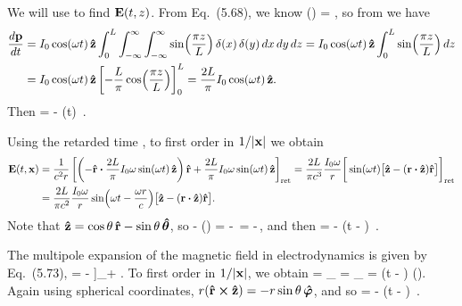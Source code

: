 \begin{solution}
	We will use  to find $\vb{E}(t, z)$.  From Eq.~(5.68), we know
	\beq
		\int \vJ(\vx) \dcx = ,
	\eeq
	so from  we have
	\begin{align*}
		\dv{\vb{p}}{t} &= I_0 \cos(\omega t) \,\vb{\hat{z}} \int_0^L \int_{-\infty}^\infty \int_{-\infty}^\infty \sin(\frac{\pi z}{L}) \,\delta(x) \,\delta(y) \dd{x} \dd{y} \dd{z}
		= I_0 \cos(\omega t) \,\vb{\hat{z}} \int_0^L \sin(\frac{\pi z}{L}) \dd{z} \\
		&= I_0 \cos(\omega t) \,\vb{\hat{z}} \left[ -\frac{L}{\pi} \cos(\frac{\pi z}{L}) \right]_0^L
		= \frac{2 L}{\pi} I_0 \cos(\omega t) \,\vb{\hat{z}}.
	\end{align*}
	Then
	\beq
		 = - \Io \omg \sin(\omg t) \,\zh.
	\eeq
	
	Using the retarded time , to first order in $1/\abs{\vb{x}}$ we obtain
	\begin{align*}
		\vE\tx &= \frac{1}{c^2 r} \left[ \left( -\rh \vdot \frac{2 L}{\pi} \Io \omg \sin(\omg t) \,\zh \right) \rh + \frac{2 L}{\pi} \Io \omg \sin(\omg t) \,\zh \right]_\ret
		= \frac{2 L}{\pi c^3} \frac{\Io \omg}{r} \bigg[ \sin(\omg t) \big[ \zh - (\vr \vdot \zh) \rh \big] \bigg]_\ret \\
		&= \frac{2 L}{\pi c^2} \frac{\Io \omg}{r} \sin(\omg t - \frac{\omg r}{c}) \big[ \zh - (\vr \vdot \zh) \rh \big].
	\end{align*}
	Note that $\vb{\hat{z}} = \cos\theta \,\vb{\hat{r}} - \sin\theta \,\boldsymbol{\hat{\theta}}$, so
	\beq
		\zh - (\rh \vdot \zh) \rh = \zh - \cos\tht \,\rh = -\sin\tht \,\thh,
	\eeq
	and then
	\beq
		\vE\tx = -  \sin(\omg t - ) \sin\tht \,\thh.
	\eeq

	The multipole expansion of the magnetic field in electrodynamics is given by Eq.~(5.73),
	\beqn \label{Bfield}
		\vB\tx = - \xh \cross \left[ \dv[2]{\vp}{t} \right]_\ret + .
	\eeqn
	To first order in $1/\abs{\vb{x}}$, we obtain
	\beq
		\vB\tx =  \rh \cross {}_\ret
		=   \rh \cross {}_\ret
		=   \sin(\omg t - ) (\rh \cross \zh).
	\eeq
	Again using spherical coordinates, $r (\vb{\hat{r}} \cross \vb{\hat{z}}) = -r \sin\theta \,\boldsymbol{\hat{\varphi}}$, and so
	\beq
		\vB\tx = -  \sin(\omg t - ) \sin\tht \,\phh.
	\eeq
	\vfix
\end{solution}